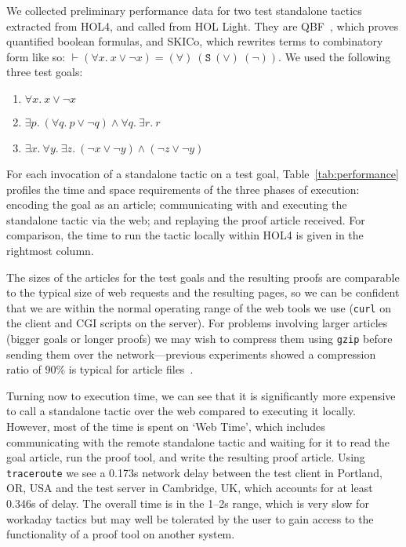 \documentclass{llncs}
\begin{document}
We collected preliminary performance data for two test standalone tactics extracted from HOL4, and called from HOL Light.
They are QBF~\cite{DBLP:conf/itp/KumarW11}, which proves quantified boolean formulas, and SKICo, which rewrites terms to combinatory form like so: $\vdash(\forall{x}.\ x\lor\lnot x)=(\forall)\ (\mathtt{S}\ (\lor)\ (\lnot))$.
We used the following three test goals:
\begin{enumerate}
\item $\forall x.\ x \lor\lnot x$

\item $\exists p.\ (\forall q.\ p \lor\lnot q) \land\forall q.\ \exists r.\ r$

\item $\exists x.\ \forall y.\ \exists z.\ (\lnot x \lor\lnot y) \land (\lnot z\lor\lnot y)$
\end{enumerate}
For each invocation of a standalone tactic on a test goal, Table~\ref{tab:performance} profiles the time and space requirements of the three phases of execution: encoding the goal as an article; communicating with and executing the standalone tactic via the web; and replaying the proof article received.
For comparison, the time to run the tactic locally within HOL4 is given in the rightmost column.

The sizes of the articles for the test goals and the resulting proofs are comparable to the typical size of web requests and the resulting pages, so we can be confident that we are within the normal operating range of the web tools we use (\texttt{curl} on the client and CGI scripts on the server).
For problems involving larger articles (bigger goals or longer proofs) we may wish to compress them using \texttt{gzip} before sending them over the network---previous experiments showed a compression ratio of 90\% is typical for article files~\cite{hurd2009}.

Turning now to execution time, we can see that it is significantly more expensive to call a standalone tactic over the web compared to executing it locally. However, most of the time is spent on `Web Time', which includes communicating with the remote standalone tactic and waiting for it to read the goal article, run the proof tool, and write the resulting proof article.
Using \texttt{traceroute} we see a 0.173s network delay between the test client in Portland, OR, USA and the test server in Cambridge, UK, which accounts for at least 0.346s of delay.
The overall time is in the 1--2s range, which is very slow for workaday tactics but may well be tolerated by the user to gain access to the functionality of a proof tool on another system.
\end{document}
